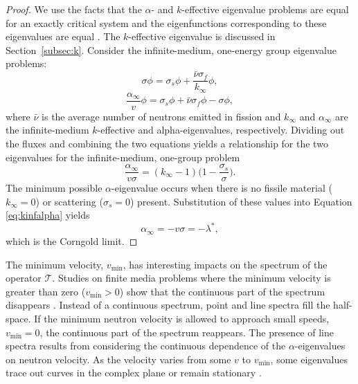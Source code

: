 \begin{proof}
	We use the facts that the $\alpha$- and $k$-effective eigenvalue problems are equal for an exactly critical system and the eigenfunctions corresponding to these eigenvalues are equal \cite{velarde_analysis_1978}. The $k$-effective eigenvalue is discussed in Section~\ref{subsec:k}. Consider the infinite-medium, one-energy group eigenvalue problems:
	\begin{equation}
		\sigma \phi = \sigma_{s} \phi + \frac{\bar{\nu}\sigma_{f}}{k_{\infty}} \phi,
	\end{equation}
	\begin{equation}
		\frac{\alpha_{\infty}}{v}\phi = \sigma_{s} \phi + \bar{\nu}\sigma_{f}\phi - \sigma \phi,
	\end{equation}
where $\bar{\nu}$ is the average number of neutrons emitted in fission and $k_{\infty}$ and $\alpha_{\infty}$ are the infinite-medium $k$-effective and alpha-eigenvalues, respectively. Dividing out the fluxes and combining the two equations yields a relationship for the two eigenvalues for the infinite-medium, one-group problem \cite{kornreich_timeeigenvalue_2005}
\begin{equation}
	\frac{\alpha_{\infty}}{v\sigma} = (k_{\infty}-1) \bigg ( 1 - \frac{\sigma_{s}}{\sigma} \bigg ).
\label{eq:kinfalpha}
\end{equation}
The minimum possible $\alpha$-eigenvalue occurs when there is no fissile material ($k_{\infty} = 0$) or scattering ($\sigma_{s} = 0$) present. Substitution of these values into Equation \ref{eq:kinfalpha} yields
\begin{equation}
	\alpha_{\infty} = - v \sigma = -\lambda^{*},
\end{equation}
which is the Corngold limit.
\end{proof}

The minimum velocity, $v_{\text{min}}$, has interesting impacts on the spectrum of the operator $\mathcal{T}$. Studies on finite media problems where the minimum velocity is greater than zero ($v_{\text{min}} > 0$) show that the continuous part of the spectrum disappears \cite{jorgens_asymptotic_1958}. Instead of a continuous spectrum, point and line spectra fill the half-space. If the minimum neutron velocity is allowed to approach small speeds, $v_{\text{min}} = 0$, the continuous part of the spectrum reappears. The presence of line spectra results from considering the continuous dependence of the $\alpha$-eigenvalues on neutron velocity. As the velocity varies from some $v$ to $v_{\text{min}}$, some eigenvalues trace out curves in the complex plane or remain stationary \cite{larsen_spectrum_1974}.

